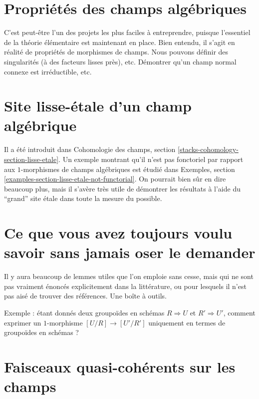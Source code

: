 \section{Propriétés des champs algébriques}
\label{section-stacks-properties}

\noindent
C'est peut-être l'un des projets les plus faciles à entreprendre, puisque l'essentiel de la
théorie élémentaire est maintenant en place. Bien entendu, il s'agit en réalité de propriétés
de morphismes de champs. Nous pouvons définir des singularités (à des facteurs lisses près),
etc. Démontrer qu'un champ normal connexe est irréductible, etc.


\section{Site lisse-\'etale d'un champ algébrique}
\label{section-lisse-etale}

\noindent
Il a été introduit dans
Cohomologie des champs, section \ref{stacks-cohomology-section-lisse-etale}.
Un exemple montrant qu'il n'est pas fonctoriel par rapport aux $1$-morphismes
de champs algébriques est étudié dans
Exemples, section \ref{examples-section-lisse-etale-not-functorial}.
On pourrait bien sûr en dire beaucoup plus, mais il s'avère
très utile de démontrer les résultats à l'aide du ``grand'' site \'etale
dans toute la mesure du possible.



\section{Ce que vous avez toujours voulu savoir sans jamais oser le demander}
\label{section-stacks-fun-lemmas}

\noindent
Il y aura beaucoup de lemmes utiles que l'on emploie sans cesse,
mais qui ne sont pas vraiment énoncés explicitement dans la littérature,
ou pour lesquels il n'est pas aisé de trouver des références. Une boîte à outils.

\medskip\noindent
Exemple : étant donnés deux groupoïdes en schémas $R\Rightarrow U$ et
$R' \Rightarrow U'$, comment exprimer un $1$-morphisme
$[U/R] \to [U'/R']$ uniquement en termes de groupoïdes en schémas ?



\section{Faisceaux quasi-cohérents sur les champs}
\label{section-quasi-coherent}


